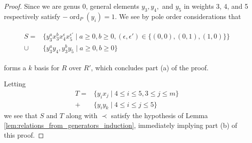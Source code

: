 \documentclass{amsart}
\theoremstyle{plain}
\theoremstyle{definition}
\theoremstyle{remark}
\numberwithin{equation}{section}
\DeclareMathOperator{\ord}{ord}
\begin{document}
\begin{proof}
Since we are genus 0, general
elements $y_3, y_4,$ and $y_5$ in weights 3, 4, and 5 respectively satisfy $- \ord_P(y_i) =
1$.   We see by pole order considerations that

\begin{align}
\label{eqn:add_one_generator}
	\begin{split}
	S=	&\{ y_3^ax_3^b x_4^\epsilon x_5^{\epsilon'} \mid a \geq 0, b 
		\geq 0,(\epsilon,\epsilon') \in \{(0,0),(0,1),(1,0)\} \} \\
	\cup \;&\{y_3^ay_4, y_3^by_5 \mid a \geq 0, b \geq 0 \}
	\end{split}
\end{align}

\noindent forms a $k$ basis for $R$ over $R'$, which concludes part (a) of the proof.

Letting
\begin{align*}
	T = & \{ y_i x_j \mid 4 \leq i \leq 5, 3 \leq j \leq m\} \\
	   + & \{ y_i y_k \mid 4 \leq i \leq j \leq 5\} 
\end{align*}
we see that $S$ and $T$ along with $\prec$ satisfy the hypothesis of Lemma \ref{lem:relations_from_generators_induction}, immediately implying part (b) of this proof.



%
%
%
%
%
%



\end{proof}
\end{document}
